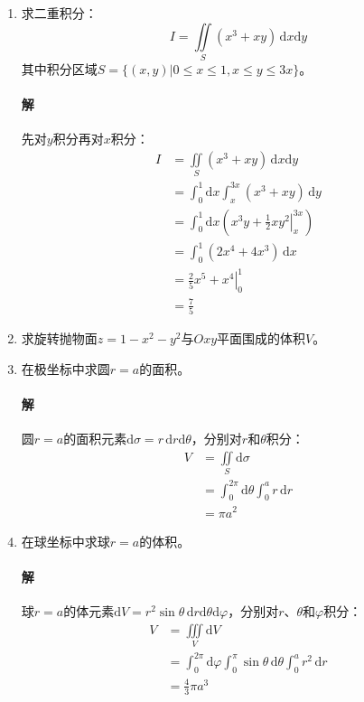 \documentclass[fontset=none,openany,a4paper]{ctexbook}
\begin{document}
\begin{enumerate}

    \item 求二重积分：
    \[
    I = \iint\limits_S (x^3+xy)\,\mathrm{d}x\mathrm{d}y
    \]
    其中积分区域$S=\{(x,y)|0\leqslant x\leqslant1,x\leqslant y\leqslant3x\}$。

    \paragraph{解} 先对$y$积分再对$x$积分：
    \begin{align*}
        I
        &= \iint\limits_S (x^3+xy)\,\mathrm{d}x\mathrm{d}y \\
        &= \int_0^1 \mathrm{d}x \int_x^{3x} (x^3+xy)\,\mathrm{d}y \\
        &= \int_0^1 \mathrm{d}x \left(\left.x^3 y + \frac{1}{2}xy^2\right|_x^{3x}\right) \\
        &= \int_0^1 (2x^4 + 4x^3)\,\mathrm{d}x \\
        &= \left.\frac{2}{5}x^5 + x^4\right|_0^1 \\
        &= \frac{7}{5}
    \end{align*}

    \item 求旋转抛物面$z=1-x^2-y^2$与$Oxy$平面围成的体积$V$。

    \item 在极坐标中求圆$r=a$的面积。

    \paragraph{解}

    圆$r = a$的面积元素$\mathrm{d}\sigma = r\,\mathrm{d}r\mathrm{d}\theta$，分别对$r$和$\theta$积分：
    \begin{align*}
        V
        &= \iint\limits_S \mathrm{d}\sigma \\
        &= \int_0^{2\pi} \mathrm{d}\theta \int_0^a r\,\mathrm{d}r \\
        &= \pi a^2
    \end{align*}

    \item 在球坐标中求球$r=a$的体积。

    \paragraph{解}

    球$r = a$的体元素$\mathrm{d}V = r^2\sin\theta\,\mathrm{d}r\mathrm{d}\theta\mathrm{d}\varphi$，分别对$r$、$\theta$和$\varphi$积分：
    \begin{align*}
        V
        &= \iiint\limits_V \mathrm{d}V \\
        &= \int_0^{2\pi} \mathrm{d}\varphi \int_0^\pi \sin\theta\,\mathrm{d}\theta \int_0^a r^2\,\mathrm{d}r \\
        &= \frac{4}{3}\pi a^3
    \end{align*}

\end{enumerate}
\end{document}
